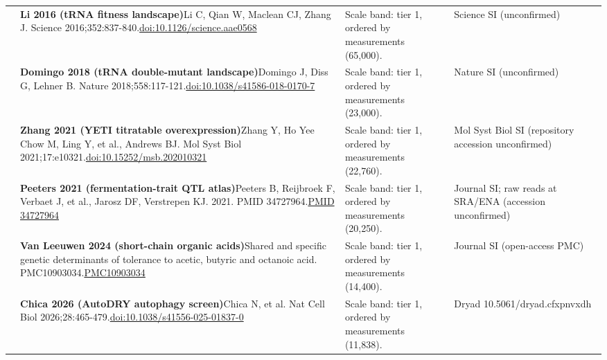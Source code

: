 \begin{landscape}
\begin{longtable}{@{}r@{\hspace{4pt}} L{86mm} L{92mm} L{62mm}@{}}
 & \textbf{Li 2016 (tRNA fitness landscape)}\newline Li C, Qian W, Maclean CJ, Zhang J. Science 2016;352:837-840.\newline \href{https://doi.org/10.1126/science.aae0568}{doi:10.1126/\allowbreak science.aae0568} & Scale band: tier 1, ordered by measurements (65,000). & Science SI (unconfirmed) \\
 & \textbf{Domingo 2018 (tRNA double-mutant landscape)}\newline Domingo J, Diss G, Lehner B. Nature 2018;558:117-121.\newline \href{https://doi.org/10.1038/s41586-018-0170-7}{doi:10.1038/\allowbreak s41586-018-0170-7} & Scale band: tier 1, ordered by measurements (23,000). & Nature SI (unconfirmed) \\
 & \textbf{Zhang 2021 (YETI titratable overexpression)}\newline Zhang Y, Ho Yee Chow M, Ling Y, et al., Andrews BJ. Mol Syst Biol 2021;17:e10321.\newline \href{https://doi.org/10.15252/msb.202010321}{doi:10.15252/\allowbreak msb.202010321} & Scale band: tier 1, ordered by measurements (22,760). & Mol Syst Biol SI (repository accession unconfirmed) \\
 & \textbf{Peeters 2021 (fermentation-trait QTL atlas)}\newline Peeters B, Reijbroek F, Verbaet J, et al., Jarosz DF, Verstrepen KJ. 2021. PMID 34727964.\newline \href{https://pubmed.ncbi.nlm.nih.gov/34727964/}{PMID 34727964} & Scale band: tier 1, ordered by measurements (20,250). & Journal SI; raw reads at SRA/\allowbreak ENA (accession unconfirmed) \\
 & \textbf{Van Leeuwen 2024 (short-chain organic acids)}\newline Shared and specific genetic determinants of tolerance to acetic, butyric and octanoic acid. PMC10903034.\newline \href{https://www.ncbi.nlm.nih.gov/pmc/articles/PMC10903034/}{PMC10903034} & Scale band: tier 1, ordered by measurements (14,400). & Journal SI (open-access PMC) \\
 & \textbf{Chica 2026 (AutoDRY autophagy screen)}\newline Chica N, et al. Nat Cell Biol 2026;28:465-479.\newline \href{https://doi.org/10.1038/s41556-025-01837-0}{doi:10.1038/\allowbreak s41556-025-01837-0} & Scale band: tier 1, ordered by measurements (11,838). & Dryad 10.5061/\allowbreak dryad.cfxpnvxdh \\

\end{longtable}
\end{landscape}
